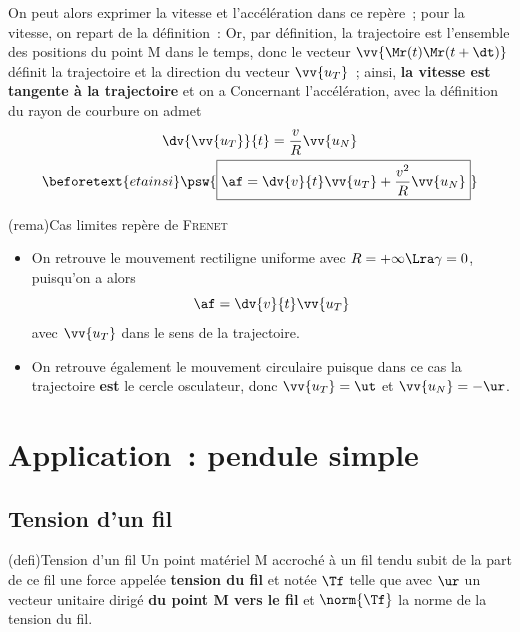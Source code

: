 \documentclass[../../main/main.tex]{subfiles}
\begin{document}
On peut alors exprimer la vitesse et l'accélération dans ce repère~; pour la
vitesse, on repart de la définition~:
Or, par définition, la trajectoire est l'ensemble des positions du point M dans
le temps, donc le vecteur $\vv{\Mr(t)\Mr(t+\dt)}$ définit la trajectoire et la
direction du vecteur $\vv{u_T}$~; ainsi, \textbf{la vitesse est tangente à la
	trajectoire} et on a
\psw{
	\[
		\boxed{\vf = v\vv{u_T}}
	\]
}
Concernant l'accélération, avec la définition du rayon de courbure on admet
\begin{gather*}
	\dv{\vv{u_T}}{t} = \frac{v}{R}\vv{u_N}
	\\
	\beforetext{et ainsi}
	\psw{
		\boxed{\af = \dv{v}{t}\vv{u_T} + \frac{v^2}{R}\vv{u_N}}
	}
\end{gather*}

\begin{tcb*}(rema){Cas limites repère de \textsc{Frenet}}
	\begin{itemize}
		\item On retrouve le mouvement rectiligne uniforme avec $R = +\infty \Lra
			      \gamma = 0$, puisqu'on a alors
		      \[\af = \dv{v}{t}\vv{u_T}\]
		      avec $\vv{u_T}$ dans le sens de la trajectoire.

		\item On retrouve également le mouvement circulaire puisque dans ce cas la
		      trajectoire \textbf{est} le cercle osculateur, donc $\vv{u_T} = \ut$ et
		      $\vv{u_N} = -\ur$.
	\end{itemize}
\end{tcb*}


\section{Application~: pendule simple}

\subsection{Tension d'un fil}
\begin{tcb*}(defi){Tension d'un fil}
	Un point matériel M accroché à un fil tendu subit de la part de ce fil une
	force appelée \textbf{tension du fil} et notée $\Tf$ telle que
	\psw{
		\[\boxed{\Tf = \norm{\Tf}\ur}\]
	}
	avec $\ur$ un vecteur unitaire dirigé \textbf{du point M vers le fil} et
	$\norm{\Tf}$ la norme de la tension du fil.
\end{tcb*}
\end{document}
